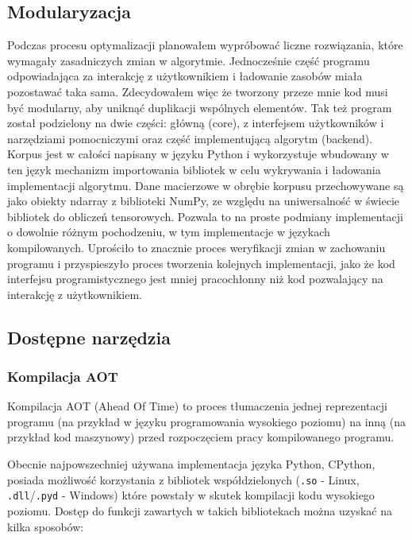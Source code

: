 \documentclass[10pt, a4paper]{article}
\newcommand{\code}[1]{\texttt{#1}}
\begin{document}
\begin{sloppypar}
    \subsection{Modularyzacja}


    Podczas procesu optymalizacji planowałem wypróbować liczne rozwiązania, które
    wymagały zasadniczych zmian w algorytmie. Jednocześnie część programu odpowiadająca za
    interakcję z użytkownikiem i ładowanie zasobów miała pozostawać taka sama.
    Zdecydowałem więc że tworzony przeze mnie kod musi być modularny, aby uniknąć duplikacji
    wspólnych elementów. Tak też program został podzielony na dwie części: główną (core),
    z interfejsem użytkowników i narzędziami pomocniczymi oraz część implementującą
    algorytm (backend). Korpus jest w całości napisany w języku Python i wykorzystuje wbudowany
    w ten język mechanizm importowania bibliotek w celu wykrywania i ładowania implementacji
    algorytmu. Dane macierzowe w obrębie korpusu przechowywane są jako obiekty ndarray z
    biblioteki NumPy, ze względu na uniwersalność w świecie bibliotek do obliczeń tensorowych.
    Pozwala to na proste podmiany implementacji o dowolnie różnym pochodzeniu, w tym implementacje
    w językach kompilowanych. Uprościło to znacznie proces weryfikacji zmian w
    zachowaniu programu i przyspieszyło proces tworzenia kolejnych implementacji, jako że
    kod interfejsu programistycznego jest mniej pracochłonny niż kod pozwalający na interakcję
    z użytkownikiem.

    \subsection{Dostępne narzędzia}


    \subsubsection{Kompilacja AOT}


    Kompilacja AOT (Ahead Of Time) to proces tłumaczenia jednej reprezentacji programu (na
    przykład w języku programowania wysokiego poziomu) na inną (na przykład kod
    maszynowy) przed rozpoczęciem pracy kompilowanego programu.

    Obecnie najpowszechniej używana implementacja języka Python, CPython, posiada możliwość
    korzystania z bibliotek współdzielonych (\code{.so} - Linux, \code{.dll}/\code{.pyd}
    - Windows) które powstały w skutek kompilacji kodu wysokiego poziomu. Dostęp do
    funkcji zawartych w takich bibliotekach można uzyskać na kilka sposobów:


\end{sloppypar}
\end{document}
